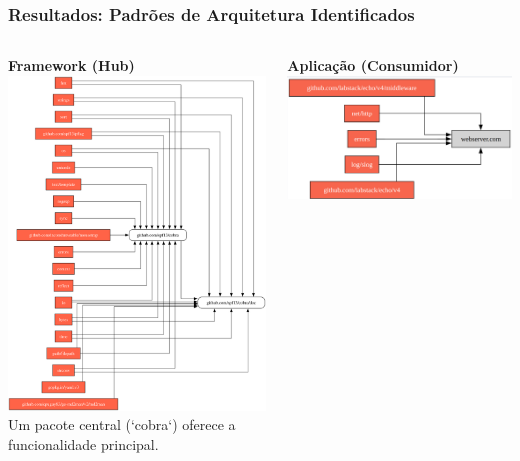\documentclass{beamer}
\begin{document}
\begin{frame}
  \frametitle{Resultados: Padrões de Arquitetura Identificados}

  \begin{columns}[T]
    \begin{column}{0.32\textwidth}
      \centering
      \textbf{Framework (Hub)}\\
      \includegraphics[width=\textwidth]{images/github.com_spf13_cobra.png}
      \tiny
      Um pacote central (`cobra`) oferece a funcionalidade principal.
    \end{column}
    \begin{column}{0.32\textwidth}
      \centering
      \textbf{Aplicação (Consumidor)}\\
      \includegraphics[width=\textwidth]{images/webserver.png}

\end{column}
\end{columns}
\end{frame}
\end{document}
